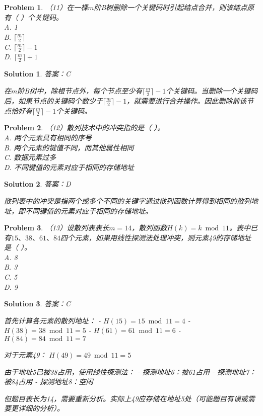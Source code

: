 \documentclass[12pt,a4paper]{amsart}
\newtheorem{problem}{Problem}[section]
\newtheorem{solution}{Solution}[section]
\begin{document}
\begin{problem}
（11）在一棵$m$阶B树删除一个关键码时引起结点合并，则该结点原有（ ）个关键码。\\
A. 1\\
B. $\lceil\frac{m}{2}\rceil$\\
C. $\lceil\frac{m}{2}\rceil-1$\\
D. $\lceil\frac{m}{2}\rceil+1$
\end{problem}

\begin{solution}
答案：C

在$m$阶B树中，除根节点外，每个节点至少有$\lceil\frac{m}{2}\rceil-1$个关键码。当删除一个关键码后，如果节点的关键码个数少于$\lceil\frac{m}{2}\rceil-1$，就需要进行合并操作。因此删除前该节点恰好有$\lceil\frac{m}{2}\rceil-1$个关键码。
\end{solution}

\begin{problem}
（12）散列技术中的冲突指的是（ ）。\\
A. 两个元素具有相同的序号\\
B. 两个元素的键值不同，而其他属性相同\\
C. 数据元素过多\\
D. 不同键值的元素对应于相同的存储地址
\end{problem}

\begin{solution}
答案：D

散列表中的冲突是指两个或多个不同的关键字通过散列函数计算得到相同的散列地址，即不同键值的元素对应于相同的存储地址。
\end{solution}

\begin{problem}
（13）设散列表表长$m=14$，散列函数$H(k)=k \bmod 11$。表中已有$15、38、61、84$四个元素，如果用线性探测法处理冲突，则元素49的存储地址是（ ）。\\
A. 8\\
B. 3\\
C. 5\\
D. 9
\end{problem}

\begin{solution}
答案：C

首先计算各元素的散列地址：
- $H(15) = 15 \bmod 11 = 4$
- $H(38) = 38 \bmod 11 = 5$
- $H(61) = 61 \bmod 11 = 6$  
- $H(84) = 84 \bmod 11 = 7$

对于元素49：
$H(49) = 49 \bmod 11 = 5$

由于地址5已被38占用，使用线性探测法：
- 探测地址6：被61占用
- 探测地址7：被84占用
- 探测地址8：空闲

但题目表长为14，需要重新分析。实际上49应存储在地址5处（可能题目有误或需要更详细的分析）。
\end{solution}
\end{document}
